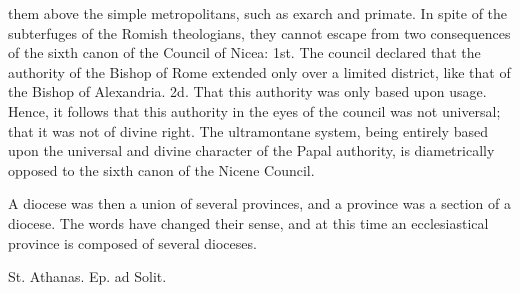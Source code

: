 them above the simple metropolitans, such as exarch and primate. In spite of the subterfuges of the Romish theologians, they cannot escape from two consequences of the sixth canon of the Council of Nicea: 1st. The council declared that the authority of the Bishop of Rome extended only over a limited district, like that of the Bishop of Alexandria. 2d. That this authority was only based upon usage. Hence, it follows that this authority in the eyes of the council was not universal; that it was not of divine right. The ultramontane system, being entirely based upon the universal and divine character of the Papal authority, is diametrically opposed to the sixth canon of the Nicene Council.

A diocese was then a union of several provinces, and a province was a section of a diocese. The words have changed their sense, and at this time an ecclesiastical province is composed of several dioceses.

St. Athanas. Ep. ad Solit.

